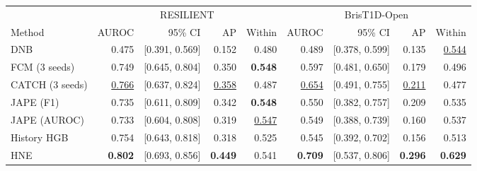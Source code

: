 \begin{tabular*}{\linewidth}{@{\extracolsep{\fill}}lrrrrrrrr@{}}
\toprule
& \multicolumn{4}{c}{RESILIENT} & \multicolumn{4}{c}{BrisT1D-Open} \\
\cmidrule(lr){2-5}\cmidrule(lr){6-9}
Method & AUROC & 95\% CI & AP & Within & AUROC & 95\% CI & AP & Within \\
\midrule
DNB & 0.475 & [0.391, 0.569] & 0.152 & 0.480 & 0.489 & [0.378, 0.599] & 0.135 & \underline{0.544} \\
FCM (3 seeds) & 0.749 & [0.645, 0.804] & 0.350 & \textbf{0.548} & 0.597 & [0.481, 0.650] & 0.179 & 0.496 \\
CATCH (3 seeds) & \underline{0.766} & [0.637, 0.824] & \underline{0.358} & 0.487 & \underline{0.654} & [0.491, 0.755] & \underline{0.211} & 0.477 \\
JAPE (F1) & 0.735 & [0.611, 0.809] & 0.342 & \textbf{0.548} & 0.550 & [0.382, 0.757] & 0.209 & 0.535 \\
JAPE (AUROC) & 0.733 & [0.604, 0.808] & 0.319 & \underline{0.547} & 0.549 & [0.388, 0.739] & 0.160 & 0.537 \\
History HGB & 0.754 & [0.643, 0.818] & 0.318 & 0.525 & 0.545 & [0.392, 0.702] & 0.156 & 0.513 \\
\cellcolor{hnegray}HNE & \textbf{0.802} & [0.693, 0.856] & \textbf{0.449} & 0.541 & \textbf{0.709} & [0.537, 0.806] & \textbf{0.296} & \textbf{0.629} \\
\bottomrule
\end{tabular*}